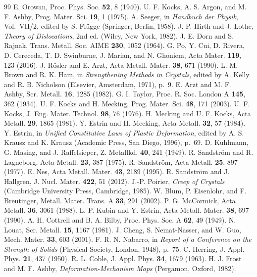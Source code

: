 \documentclass[11pt]{article}
\numberwithin{equation}{section}
\begin{document}
\begin{thebibliography}{99}
 E. Orowan, Proc. Phys. Soc. \textbf{52}, 8 (1940).
 U. F. Kocks, A. S. Argon, and M. F. Ashby, Prog. Mater. Sci. \textbf{19}, 1 (1975).
 A. Seeger, in \emph{Handbuch der Physik}, Vol.~VII/2, edited by S. Fl\"ugge (Springer, Berlin, 1958).
 J. P. Hirth and J. Lothe, \emph{Theory of Dislocations}, 2nd ed. (Wiley, New York, 1982).
 J. E. Dorn and S. Rajnak, Trans. Metall. Soc. AIME \textbf{230}, 1052 (1964).
 G. Po, Y. Cui, D. Rivera, D. Cereceda, T. D. Swinburne, J. Marian, and N. Ghoniem, Acta Mater. \textbf{119}, 123 (2016).
 J. R\"osler and E. Arzt, Acta Metall. Mater. \textbf{38}, 671 (1990).
 L. M. Brown and R. K. Ham, in \emph{Strengthening Methods in Crystals}, edited by A. Kelly and R. B. Nicholson (Elsevier, Amsterdam, 1971), p.~9.
 E. Arzt and M. F. Ashby, Scr. Metall. \textbf{16}, 1285 (1982).
 G. I. Taylor, Proc. R. Soc. London A \textbf{145}, 362 (1934).
 U. F. Kocks and H. Mecking, Prog. Mater. Sci. \textbf{48}, 171 (2003).
 U. F. Kocks, J. Eng. Mater. Technol. \textbf{98}, 76 (1976).
 H. Mecking and U. F. Kocks, Acta Metall. \textbf{29}, 1865 (1981).
 Y. Estrin and H. Mecking, Acta Metall. \textbf{32}, 57 (1984).
 Y. Estrin, in \emph{Unified Constitutive Laws of Plastic Deformation}, edited by A. S. Krausz and K. Krausz (Academic Press, San Diego, 1996), p.~69.
 D. Kuhlmann, G. Masing, and J. Raffelsieper, Z. Metallkd. \textbf{40}, 241 (1949).
 R. Sandstr\"om and R. Lagneborg, Acta Metall. \textbf{23}, 387 (1975).
 R. Sandstr\"om, Acta Metall. \textbf{25}, 897 (1977).
 E. Nes, Acta Metall. Mater. \textbf{43}, 2189 (1995).
 R. Sandstr\"om and J. Hallgren, J. Nucl. Mater. \textbf{422}, 51 (2012).
 J.-P. Poirier, \emph{Creep of Crystals} (Cambridge University Press, Cambridge, 1985).
 W. Blum, P. Eisenlohr, and F. Breutinger, Metall. Mater. Trans. A \textbf{33}, 291 (2002).
 P. G. McCormick, Acta Metall. \textbf{36}, 3061 (1988).
 L. P. Kubin and Y. Estrin, Acta Metall. Mater. \textbf{38}, 697 (1990).
 A. H. Cottrell and B. A. Bilby, Proc. Phys. Soc. A \textbf{62}, 49 (1949).
 N. Louat, Scr. Metall. \textbf{15}, 1167 (1981).
 J. Cheng, S. Nemat-Nasser, and W. Guo, Mech. Mater. \textbf{33}, 603 (2001).
 F. R. N. Nabarro, in \emph{Report of a Conference on the Strength of Solids} (Physical Society, London, 1948), p.~75.
 C. Herring, J. Appl. Phys. \textbf{21}, 437 (1950).
 R. L. Coble, J. Appl. Phys. \textbf{34}, 1679 (1963).
 H. J. Frost and M. F. Ashby, \emph{Deformation-Mechanism Maps} (Pergamon, Oxford, 1982).
\end{thebibliography}
\end{document}
